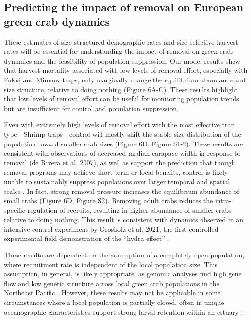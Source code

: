 \documentclass{article}
\begin{document}
\subsection{Predicting the impact of removal on European green crab dynamics}

These estimates of size-structured demographic rates and size-selective harvest rates will be essential for understanding the impact of removal on green crab dynamics and the feasibility of population suppression. Our model results show that harvest mortality associated with low levels of removal effort, especially with Fukui and Minnow traps, only marginally change the equilibrium abundance and size structure, relative to doing nothing (Figure 6A-C). These results highlight that low levels of removal effort can be useful for monitoring population trends but are insufficient for control and population suppression.

Even with extremely high levels of removal effort with the most effective trap type - Shrimp traps - control will mostly shift the stable size distribution of the population toward smaller crab sizes (Figure 6D; Figure S1-2). These results are consistent with observations of decreased median carapace width in response to removal (de Rivera et al. 2007), as well as support the prediction that though removal programs may achieve short-term or local benefits, control is likely unable to sustainably suppress populations over larger temporal and spatial scales \parencite{keller2025transition, tummon2024rebound, kanary2014modelling}. In fact, strong removal pressure increases the equilibrium abundance of small crabs (Figure 6D, Figure S2). Removing adult crabs reduces the intra-specific regulation of recruits, resulting in higher abundance of smaller crabs relative to doing nothing. This result is consistent with dynamics observed in an intensive control experiment by Grosholz et al. 2021, the first controlled experimental field demonstration of the “hydra effect” \parencite{grosholz2021stage}.

These results are dependent on the assumption of a completely open population, where recruitment rate is independent of the local population size. This assumption, in general, is likely appropriate, as genomic analyses find high gene flow and low genetic structure across local green crab populations in the Northeast Pacific \parencite{tepolt2009european, tepolt2022balanced}. However, these results may not be applicable in some circumstances where a local population is partially closed, often in unique oceanographic characteristics support strong larval retention within an estuary \parencite{grosholz2021stage}. 
\end{document}
